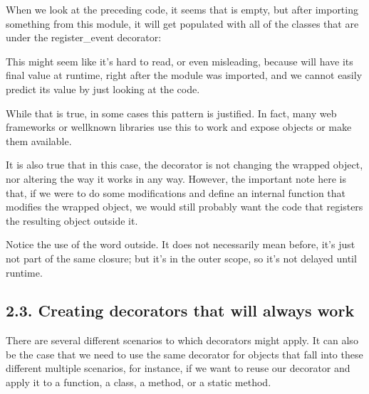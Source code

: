 \documentclass[a4paper,10pt,english]{sphinxmanual}
\begin{document}
When we look at the preceding code, it seems that  is empty, but after
importing something from this module, it will get populated with all of the classes that are
under the register\_event decorator:

\begin{sphinxVerbatim}[commandchars=\\\{\}]
   
\end{sphinxVerbatim}

This might seem like it’s hard to read, or even misleading, because  will
have its final value at runtime, right after the module was imported, and we cannot easily
predict its value by just looking at the code.

While that is true, in some cases this pattern is justified. In fact, many web frameworks or
well\sphinxhyphen{}known libraries use this to work and expose objects or make them available.

It is also true that in this case, the decorator is not changing the wrapped object, nor altering
the way it works in any way. However, the important note here is that, if we were to do
some modifications and define an internal function that modifies the wrapped object, we
would still probably want the code that registers the resulting object outside it.

Notice the use of the word outside. It does not necessarily mean before, it’s just not part of
the same closure; but it’s in the outer scope, so it’s not delayed until runtime.


\subsection{2.3. Creating decorators that will always work}
\label{\detokenize{chapters/5_decorators/index:creating-decorators-that-will-always-work}}
There are several different scenarios to which decorators might apply. It can also be the
case that we need to use the same decorator for objects that fall into these different multiple
scenarios, for instance, if we want to reuse our decorator and apply it to a function, a class,
a method, or a static method.
\end{document}
